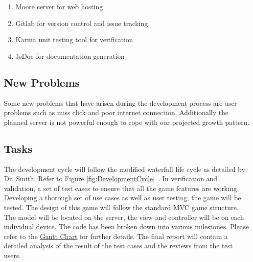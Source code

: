 \documentclass[12pt, titlepage]{article}
\begin{document}
\begin{enumerate}
	\item Moore server for web hosting
  	\item Gitlab for version control and issue tracking 
	\item Karma unit testing tool for verification 
	\item JsDoc for documentation generation
\end{enumerate}

\subsection{New Problems}
Some new problems that have arisen during the development process are user
problems such as miss click and poor internet connection. Additionally the
planned server is not powerful enough to cope with our projected growth pattern.

\subsection{Tasks}
The development cycle will follow the modified waterfall life cycle as detailed
by Dr. Smith. Refer to Figure \ref{fig:DevelopmentCycle}~\citep{Slides}. In
verification and validation, a set of test cases to ensure that all the game
features are working. Developing a thorough set of use cases as well as user
testing, the game will be tested. The design of this game will follow the
standard MVC game structure. The model will be located on the server, the view
and controller will be on each individual device. The code has been broken down
into various milestones. Please refer to the
\href{run:../../ProjectSchedule/Gantt Chart.gan}{Gantt Chart} for further
details. The final report will contain a detailed analysis of the result of the
test cases and the reviews from the test users.
\end{document}
